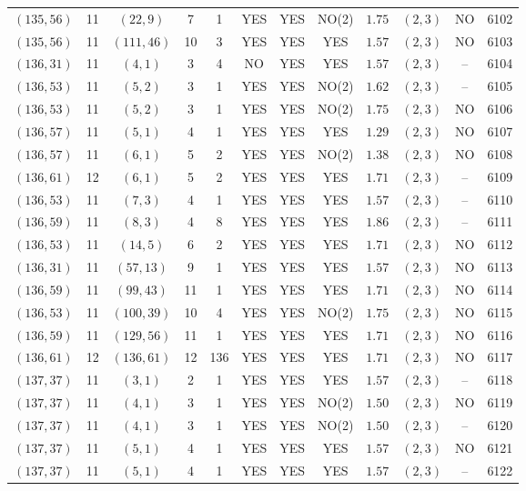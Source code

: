 \begin{longtable}{|c|c|c|c|c|c|c|c|c|c|c|c|}
$(135,56)$ & 11 & $(22,9)$ & 7 & 1 & YES & YES & NO(2) & $1.75$ & $(2,3)$ & NO & 6102\\
$(135,56)$ & 11 & $(111,46)$ & 10 & 3 & YES & YES & YES & $1.57$ & $(2,3)$ & NO & 6103\\
$(136,31)$ & 11 & $(4,1)$ & 3 & 4 & NO & YES & YES & $1.57$ & $(2,3)$ & -- & 6104\\
$(136,53)$ & 11 & $(5,2)$ & 3 & 1 & YES & YES & NO(2) & $1.62$ & $(2,3)$ & -- & 6105\\
$(136,53)$ & 11 & $(5,2)$ & 3 & 1 & YES & YES & NO(2) & $1.75$ & $(2,3)$ & NO & 6106\\
$(136,57)$ & 11 & $(5,1)$ & 4 & 1 & YES & YES & YES & $1.29$ & $(2,3)$ & NO & 6107\\
$(136,57)$ & 11 & $(6,1)$ & 5 & 2 & YES & YES & NO(2) & $1.38$ & $(2,3)$ & NO & 6108\\
$(136,61)$ & 12 & $(6,1)$ & 5 & 2 & YES & YES & YES & $1.71$ & $(2,3)$ & -- & 6109\\
$(136,53)$ & 11 & $(7,3)$ & 4 & 1 & YES & YES & YES & $1.57$ & $(2,3)$ & -- & 6110\\
$(136,59)$ & 11 & $(8,3)$ & 4 & 8 & YES & YES & YES & $1.86$ & $(2,3)$ & -- & 6111\\
$(136,53)$ & 11 & $(14,5)$ & 6 & 2 & YES & YES & YES & $1.71$ & $(2,3)$ & NO & 6112\\
$(136,31)$ & 11 & $(57,13)$ & 9 & 1 & YES & YES & YES & $1.57$ & $(2,3)$ & NO & 6113\\
$(136,59)$ & 11 & $(99,43)$ & 11 & 1 & YES & YES & YES & $1.71$ & $(2,3)$ & NO & 6114\\
$(136,53)$ & 11 & $(100,39)$ & 10 & 4 & YES & YES & NO(2) & $1.75$ & $(2,3)$ & NO & 6115\\
$(136,59)$ & 11 & $(129,56)$ & 11 & 1 & YES & YES & YES & $1.71$ & $(2,3)$ & NO & 6116\\
$(136,61)$ & 12 & $(136,61)$ & 12 & 136 & YES & YES & YES & $1.71$ & $(2,3)$ & NO & 6117\\
$(137,37)$ & 11 & $(3,1)$ & 2 & 1 & YES & YES & YES & $1.57$ & $(2,3)$ & -- & 6118\\
$(137,37)$ & 11 & $(4,1)$ & 3 & 1 & YES & YES & NO(2) & $1.50$ & $(2,3)$ & NO & 6119\\
$(137,37)$ & 11 & $(4,1)$ & 3 & 1 & YES & YES & NO(2) & $1.50$ & $(2,3)$ & -- & 6120\\
$(137,37)$ & 11 & $(5,1)$ & 4 & 1 & YES & YES & YES & $1.57$ & $(2,3)$ & NO & 6121\\
$(137,37)$ & 11 & $(5,1)$ & 4 & 1 & YES & YES & YES & $1.57$ & $(2,3)$ & -- & 6122\\

\end{longtable}
